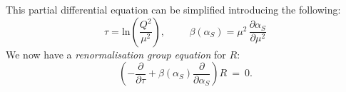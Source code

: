 

This partial differential equation can be simplified introducing
the following:
\begin{equation}
\tau = \textrm{ln}\left( \frac{Q^{2}}{\mu^{2}} \right),\hspace{1cm}\beta(\alpha_{S})=\mu^{2}\,\frac{\partial\alpha_{S}}{\partial\mu^{2}}
\end{equation}
We now have a \textit{renormalisation group equation} for $R$:
\begin{equation}
\left( -\frac{\partial}{\partial\tau} +
  \beta(\alpha_{S})\frac{\partial}{\partial\alpha_{S}}\right)R\:=\:0.
\end{equation}

